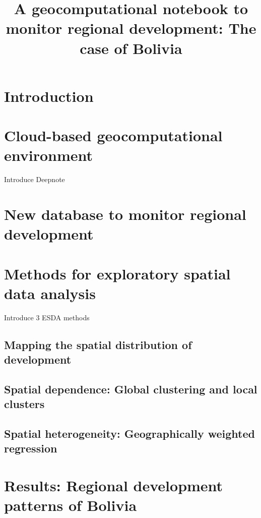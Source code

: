 \documentclass[a4paper,twoside]{article}
\title{A geocomputational notebook to monitor regional development: The case of Bolivia}
\author{}
\date{} %
\begin{document}

\maketitle

\begin{abstract}
\end{abstract}

\section{Introduction}



\section{Cloud-based geocomputational environment}

Introduce Deepnote

\section{New database to monitor regional development}



\section{Methods for exploratory spatial data analysis}

Introduce 3 ESDA methods

\subsection{Mapping the spatial distribution of development}

\subsection{Spatial dependence: Global clustering and local clusters}

\subsection{Spatial heterogeneity: Geographically weighted regression}


\section{Results: Regional development patterns of Bolivia}
\end{document}
